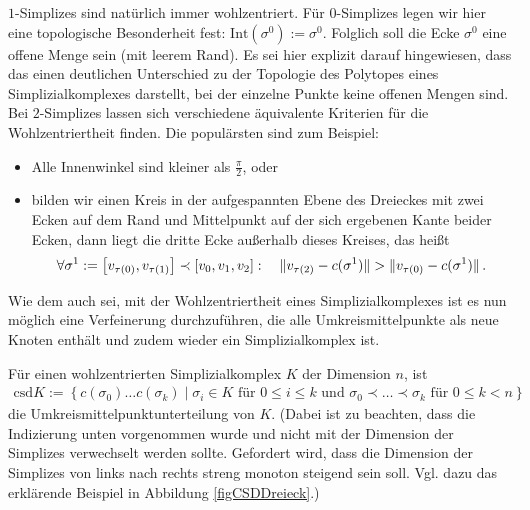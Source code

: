     \( 1 \)-Simplizes sind natürlich immer wohlzentriert. 
    Für \( 0 \)-Simplizes legen wir hier eine topologische Besonderheit fest: \(\text{Int}(\sigma^{0}) := \sigma^{0}\).
    Folglich soll die Ecke \( \sigma^{0} \) eine offene Menge sein (mit leerem Rand).
    Es sei hier explizit darauf hingewiesen, dass das einen deutlichen Unterschied zu der Topologie des Polytopes eines Simplizialkomplexes darstellt,
    bei der einzelne Punkte keine offenen Mengen sind.
    Bei \( 2 \)-Simplizes lassen sich verschiedene äquivalente Kriterien für die Wohlzentriertheit finden.
    Die populärsten sind zum Beispiel:
    \begin{itemize}
      \item Alle Innenwinkel sind kleiner als \( \frac{\pi}{2} \), oder
      \item bilden wir einen Kreis in der aufgespannten Ebene des Dreieckes mit zwei Ecken auf dem Rand und Mittelpunkt auf der sich ergebenen Kante beider Ecken, 
      dann liegt die dritte Ecke außerhalb dieses Kreises, das heißt
        \begin{align}
          \forall \sigma^{1} := \left[ v_{\tau(0)},v_{\tau(1)}\right] \prec \left[v_{0},v_{1},v_{2}\right]:\quad \|v_{\tau(2)} - c(\sigma^{1})\| > \|v_{\tau(0)} - c(\sigma^{1})\|
          \,\text{.}
        \end{align}
    \end{itemize}
    Wie dem auch sei, mit der Wohlzentriertheit eines Simplizialkomplexes ist es nun möglich eine Verfeinerung durchzuführen, die alle Umkreismittelpunkte als neue Knoten enthält und zudem
    wieder ein Simplizialkomplex ist.

    \begin{definition}
      Für einen wohlzentrierten Simplizialkomplex \( K \) der Dimension \( n \), ist
      \begin{align}
        \text{csd}K := \left\{ c(\sigma_{0}) \ldots c(\sigma_{k}) \middle| \sigma_{i}\in K \text { für } 0 \le i \le k \text{ und }
                                                                          \sigma_{0} \prec \ldots \prec \sigma_{k} \text { für } 0 \le k < n \right\}
      \end{align}
      die Umkreismittelpunktunterteilung von \( K \).
      (Dabei ist zu beachten, dass die Indizierung unten vorgenommen wurde und nicht mit der Dimension der Simplizes verwechselt werden
      sollte. Gefordert wird, dass die Dimension der Simplizes von links nach rechts streng monoton steigend sein soll. 
      Vgl. dazu das erklärende Beispiel in Abbildung \ref{figCSDDreieck}.)
    \end{definition}


